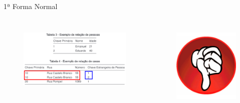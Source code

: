 \documentclass{beamer} %
\begin{document}
\begin{frame}{1ª Forma Normal}
\begin{columns}
    
    \begin{figure}
        \centering
        \includegraphics[width=\linewidth]{imagens/1-forma-normal-errado.png}
        \label{fig:1-forma-normal-errado}
    \end{figure}
    
    
    \begin{figure}
        \centering
        \includegraphics[width=\linewidth]{imagens/errado.png}
        \label{fig:1f-errado}
    \end{figure}
\end{columns}
\end{frame}
\end{document}
